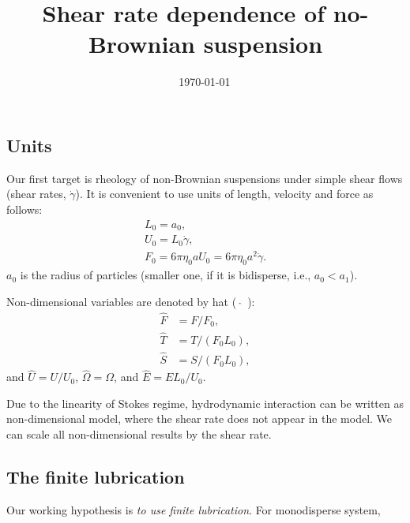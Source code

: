 \documentclass{article}
\begin{document}
\title{Shear rate dependence of no-Brownian suspension}
\date{\shortdate\today \, \ampmtime }
\maketitle
\subsection*{Units}

Our first target
is rheology of non-Brownian suspensions
under simple shear flows
(shear rates, $\dot{\gamma}$).
%
It is convenient
to use units of length, velocity and force
as follows:
\begin{gather}
 L_0 = a_0,  \\
 U_0 = L_0 \dot{\gamma}, \\
 F_0 = 6 \pi \eta_0 a U_0 = 6 \pi \eta_0 a^2 \dot{\gamma}.
\end{gather}
$a_0$ is the radius of particles
(smaller one, if it is bidisperse, i.e., $a_0 < a_1$).


Non-dimensional variables are denoted 
by hat (~$\hat{}$~):
\begin{align}
 \hat{F} &=  F/F_0, \\
 \hat{T} &=  T/(F_0 L_0), \\
 \hat{S} &=  S/(F_0 L_0),
\end{align}
and $ \hat{U} = U / U_0$,
$\hat{\Omega} = \Omega $,
and $\hat{E} = E L_0 / U_0 $.
%


Due to the linearity of Stokes regime,
hydrodynamic interaction
can be written as non-dimensional model,
where the shear rate 
does not appear in the model.
%
We can scale all non-dimensional results
by the shear rate.


\subsection*{The finite lubrication}

Our working hypothesis is
\emph{to use finite lubrication}.
%
For monodisperse system,
\end{document}
